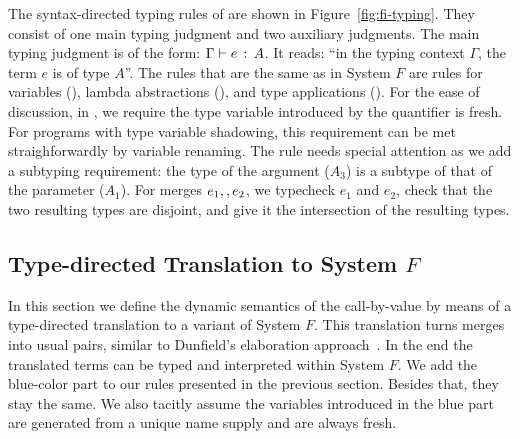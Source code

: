 The syntax-directed typing rules of \name are shown in
Figure~\ref{fig:fi-typing}. They consist of one main typing judgment and two
auxiliary judgments. The main typing judgment is of the form: $ \Gamma \vdash e \ \!:\! \ A $. It reads: ``in the typing context $\Gamma$, the term $e$ is of type
$A$''. The rules that are the same as in System $F$ are rules for variables
(), lambda abstractions (), and type applications
(). For the ease of discussion, in , we require
the type variable introduced by the quantifier is fresh. For programs with type
variable shadowing, this requirement can be met straighforwardly by variable
renaming. The rule  needs special attention as we add a subtyping
requirement: the type of the argument ($A_3$) is a subtype of that of the
parameter ($A_1$).
For merges $e_1 ,, e_2$, we typecheck $e_1$ and $e_2$, check that the two
resulting types are disjoint, and give it the intersection of the resulting
types.


\subsection{Type-directed Translation to System $ F $}

In this section we define the dynamic semantics of the call-by-value \name by
means of a type-directed translation to a variant of System $F$. This
translation turns merges into usual pairs, similar to Dunfield's elaboration
approach~\cite{dunfield2014elaborating}. In the end the translated terms can be typed and interpreted
within System $F$. We add the blue-color part to our rules presented in the
previous section. Besides that, they stay the same. We also tacitly assume the
variables introduced in the blue part are generated from a unique name supply and
are always fresh.

